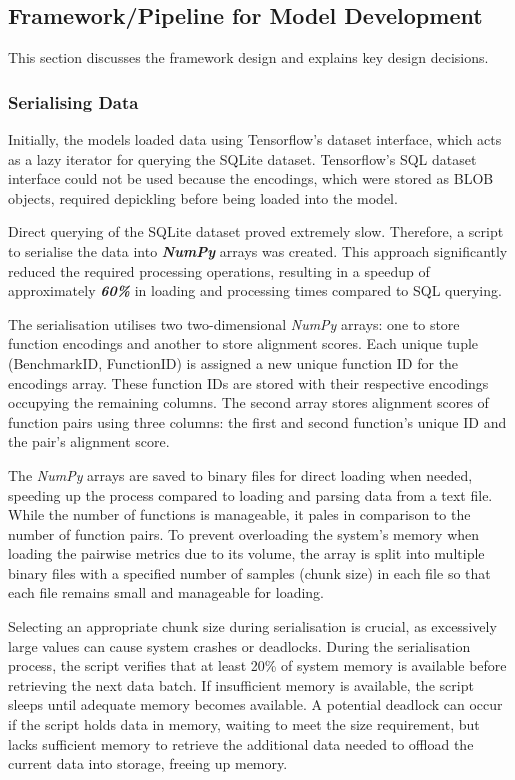 \subsection{Framework/Pipeline for Model Development}
This section discusses the framework design and explains key design decisions.

\subsubsection{Serialising Data}
Initially, the models loaded data using Tensorflow's dataset interface, which acts as a lazy iterator for querying the SQLite dataset. Tensorflow's SQL dataset interface could not be used because the encodings, which were stored as BLOB objects, required depickling before being loaded into the model.

Direct querying of the SQLite dataset proved extremely slow. Therefore, a script to serialise the data into \textbf{\textit{NumPy}} arrays was created. This approach significantly reduced the required processing operations, resulting in a speedup of approximately \textbf{\textit{60\%}} in loading and processing times compared to SQL querying.

The serialisation utilises two two-dimensional \textit{NumPy} arrays: one to store function encodings and another to store alignment scores. Each unique tuple (BenchmarkID, FunctionID) is assigned a new unique function ID for the encodings array. These function IDs are stored with their respective encodings occupying the remaining columns. The second array stores alignment scores of function pairs using three columns: the first and second function's unique ID and the pair's alignment score.

The \textit{NumPy} arrays are saved to binary files for direct loading when needed, speeding up the process compared to loading and parsing data from a text file. While the number of functions is manageable, it pales in comparison to the number of function pairs. To prevent overloading the system's memory when loading the pairwise metrics due to its volume, the array is split into multiple binary files with a specified number of samples (chunk size) in each file so that each file remains small and manageable for loading.

Selecting an appropriate chunk size during serialisation is crucial, as excessively large values can cause system crashes or deadlocks. During the serialisation process, the script verifies that at least 20\% of system memory is available before retrieving the next data batch. If insufficient memory is available, the script sleeps until adequate memory becomes available. A potential deadlock can occur if the script holds data in memory, waiting to meet the size requirement, but lacks sufficient memory to retrieve the additional data needed to offload the current data into storage, freeing up memory.

